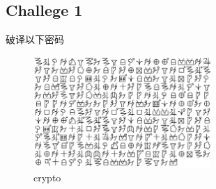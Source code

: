 \documentclass{article}
\begin{document}
\subsection*{Challege 1}
\par 破译以下密码
\begin{figure}[H]
    \centering
    \includegraphics[width=0.6\textwidth]{./figure/crypto1.png}
    \caption{crypto}
\end{figure}
\end{document}

